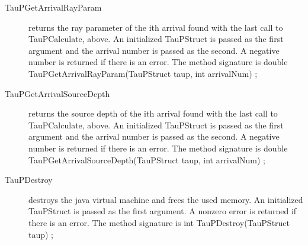 \begin{center}
\begin{description}
\item[TauPGetArrivalRayParam] returns the ray parameter of the ith arrival
found with the last call to TauPCalculate, above.
An initialized TauPStruct is passed as the first argument and 
the arrival number is passed as the second.
A negative number is returned if there is an error.
The method signature is\newline
double TauPGetArrivalRayParam(TauPStruct taup, int arrivalNum) {};

\item[TauPGetArrivalSourceDepth] returns the source depth of the ith arrival
found with the last call to TauPCalculate, above.
An initialized TauPStruct is passed as the first argument and 
the arrival number is passed as the second.
A negative number is returned if there is an error.
The method signature is\newline
double TauPGetArrivalSourceDepth(TauPStruct taup, int arrivalNum) {};

\item[TauPDestroy] destroys the java virtual machine and frees the used memory.
An initialized TauPStruct is passed as the first argument. A nonzero
error is returned if there is an error.
The method signature is\newline
int TauPDestroy(TauPStruct taup) {};

\end{description}
\end{center}

